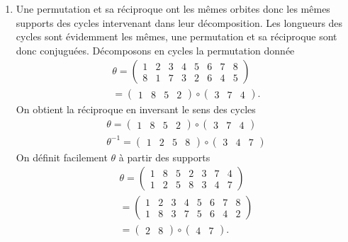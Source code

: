 \begin{enumerate}
  \item Une permutation et sa réciproque ont les mêmes orbites donc les mêmes supports des cycles intervenant dans leur décomposition. Les longueurs des cycles sont évidemment les mêmes, une permutation et sa réciproque sont donc  conjuguées.\newline
  Décomposons en cycles la permutation donnée
\begin{multline*}
\theta =
\begin{pmatrix}
 1 & 2 & 3 & 4 & 5 & 6 & 7 & 8 \\8 & 1 & 7 & 3 & 2 & 6 & 4 & 5 
\end{pmatrix}
\\
=
\begin{pmatrix}
  1 & 8 & 5 & 2
\end{pmatrix}
\circ
\begin{pmatrix}
  3 & 7 & 4
\end{pmatrix}
.
\end{multline*}
On obtient la réciproque en inversant le sens des cycles
\[
\begin{aligned}
  \theta      = \begin{pmatrix} 1 & 8 & 5 & 2 \end{pmatrix} \circ \begin{pmatrix}  3 & 7 & 4 \end{pmatrix} \\
  \theta^{-1} = \begin{pmatrix} 1 & 2 & 5 & 8 \end{pmatrix} \circ \begin{pmatrix}  3 & 4 & 7 \end{pmatrix}
\end{aligned}
\]
On définit facilement $\theta$ à partir des supports
\begin{multline*}
\theta =
\begin{pmatrix}
  1 & 8 & 5 & 2 & 3 & 7 & 4 \\
  1 & 2 & 5 & 8 & 3 & 4 & 7
\end{pmatrix}
\\
=
\begin{pmatrix}
  1 & 2 & 3 & 4 & 5 & 6 & 7 & 8 \\
  1 & 8 & 3 & 7 & 5 & 6 & 4 & 2
\end{pmatrix} \\
=
\begin{pmatrix}
  2 & 8
\end{pmatrix}
\circ 
\begin{pmatrix}
  4 & 7
\end{pmatrix}
.
\end{multline*}

\end{enumerate}
